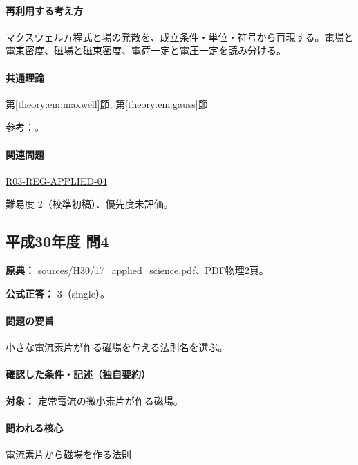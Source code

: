 \paragraph{再利用する考え方} マクスウェル方程式と場の発散を、成立条件・単位・符号から再現する。電場と電束密度、磁場と磁束密度、電荷一定と電圧一定を読み分ける。

\paragraph{共通理論} \hyperref[theory:em:maxwell]{第\ref*{theory:em:maxwell}節}, \hyperref[theory:em:gauss]{第\ref*{theory:em:gauss}節}

\par 参考：\cite{mit_em13}。

\paragraph{関連問題} \hyperref[q:r03-reg-applied-04]{R03-REG-APPLIED-04}

\par 難易度 2（校準初稿）、優先度未評価。

\subsection{平成30年度 問4}
\label{q:h30-reg-applied-04}

\noindent\textbf{原典：} sources/H30/17\_applied\_science.pdf、PDF物理2頁。

\textbf{公式正答：} 3（single）。

\paragraph{問題の要旨} 小さな電流素片が作る磁場を与える法則名を選ぶ。

\paragraph{確認した条件・記述（独自要約）}\mbox{}\par

\noindent\textbf{対象：} 定常電流の微小素片が作る磁場。\par

\paragraph{問われる核心} 電流素片から磁場を作る法則

